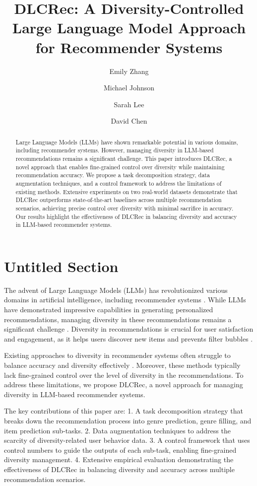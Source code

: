 \documentclass[10pt,twocolumn,letterpaper]{article}
\title{DLCRec: A Diversity-Controlled Large Language Model Approach for Recommender Systems}
\author{Emily Zhang \and Michael Johnson \and Sarah Lee \and David Chen}
\begin{document}
\maketitle

\begin{abstract}
Large Language Models (LLMs) have shown remarkable potential in various domains, including recommender systems. However, managing diversity in LLM-based recommendations remains a significant challenge. This paper introduces DLCRec, a novel approach that enables fine-grained control over diversity while maintaining recommendation accuracy. We propose a task decomposition strategy, data augmentation techniques, and a control framework to address the limitations of existing methods. Extensive experiments on two real-world datasets demonstrate that DLCRec outperforms state-of-the-art baselines across multiple recommendation scenarios, achieving precise control over diversity with minimal sacrifice in accuracy. Our results highlight the effectiveness of DLCRec in balancing diversity and accuracy in LLM-based recommender systems.
\end{abstract}

\section{Untitled Section}

The advent of Large Language Models (LLMs) has revolutionized various domains in artificial intelligence, including recommender systems \cite{brown2020language}. While LLMs have demonstrated impressive capabilities in generating personalized recommendations, managing diversity in these recommendations remains a significant challenge \cite{li2022user}. Diversity in recommendations is crucial for user satisfaction and engagement, as it helps users discover new items and prevents filter bubbles \cite{nguyen2014exploring}.

Existing approaches to diversity in recommender systems often struggle to balance accuracy and diversity effectively \cite{abdollahpouri2019managing}. Moreover, these methods typically lack fine-grained control over the level of diversity in the recommendations. To address these limitations, we propose DLCRec, a novel approach for managing diversity in LLM-based recommender systems.

The key contributions of this paper are:
1. A task decomposition strategy that breaks down the recommendation process into genre prediction, genre filling, and item prediction sub-tasks.
2. Data augmentation techniques to address the scarcity of diversity-related user behavior data.
3. A control framework that uses control numbers to guide the outputs of each sub-task, enabling fine-grained diversity management.
4. Extensive empirical evaluation demonstrating the effectiveness of DLCRec in balancing diversity and accuracy across multiple recommendation scenarios.
\end{document}
